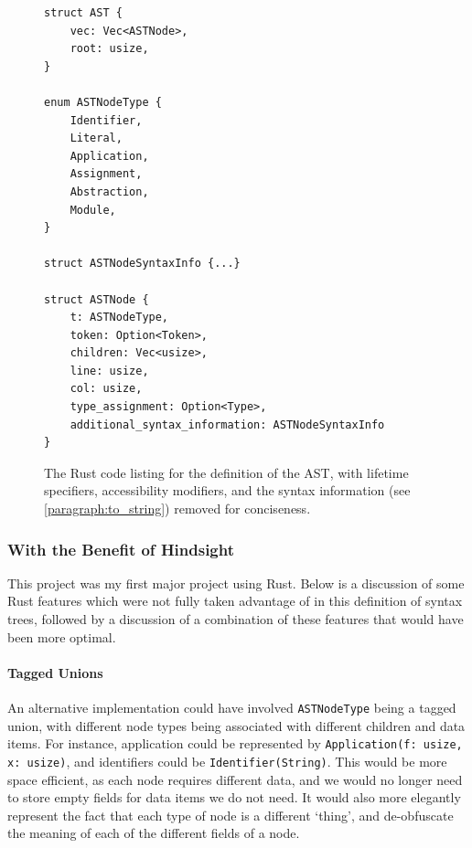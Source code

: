 \begin{figure}[t]
    \begin{lstlisting}[language=Rust_boxed]
struct AST {
    vec: Vec<ASTNode>,
    root: usize,
}

enum ASTNodeType {
    Identifier,
    Literal,
    Application,
    Assignment,
    Abstraction,
    Module,
} 

struct ASTNodeSyntaxInfo {...}

struct ASTNode {
    t: ASTNodeType,
    token: Option<Token>,
    children: Vec<usize>,
    line: usize,
    col: usize,
    type_assignment: Option<Type>,
    additional_syntax_information: ASTNodeSyntaxInfo
}
    \end{lstlisting}
    \caption{The Rust code listing for the definition of the AST, with lifetime specifiers, accessibility modifiers, and the syntax information (see \ref{paragraph:to_string}) removed for conciseness.}
    \label{fig:ast_lst}
\end{figure}


\subsubsection{With the Benefit of Hindsight} %
This project was my first major project using Rust. Below is a discussion of some Rust features which were not fully taken advantage of in this definition of syntax trees, followed by a discussion of a combination of these features that would have been more optimal. 

\paragraph{Tagged Unions}
An alternative implementation could have involved \verb|ASTNodeType| being a tagged union, with different node types being associated with different children and data items. For instance, application could be represented by \verb|Application(f: usize, x: usize)|, and identifiers could be \verb|Identifier(String)|. This would be more space efficient, as each node requires different data, and we would no longer need to store empty fields for data items we do not need. It would also more elegantly represent the fact that each type of node is a different `thing', and de-obfuscate the meaning of each of the different fields of a node. 

